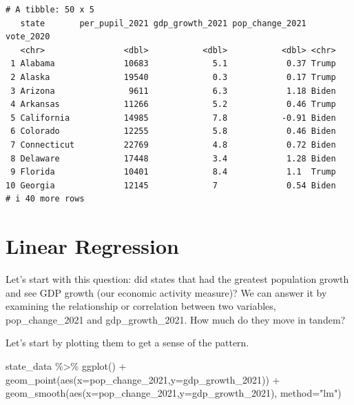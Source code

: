 \documentclass[
  letterpaper,
  DIV=11,
  numbers=noendperiod]{scrreprt}
\newenvironment{Shaded}{\begin{snugshade}}{\end{snugshade}}
\newcommand{\AttributeTok}[1]{\textcolor[rgb]{0.40,0.45,0.13}{#1}}
\newcommand{\FunctionTok}[1]{\textcolor[rgb]{0.28,0.35,0.67}{#1}}
\newcommand{\NormalTok}[1]{\textcolor[rgb]{0.00,0.23,0.31}{#1}}
\newcommand{\SpecialCharTok}[1]{\textcolor[rgb]{0.37,0.37,0.37}{#1}}
\newcommand{\StringTok}[1]{\textcolor[rgb]{0.13,0.47,0.30}{#1}}
\begin{document}
\begin{verbatim}
# A tibble: 50 x 5
   state       per_pupil_2021 gdp_growth_2021 pop_change_2021 vote_2020
   <chr>                <dbl>           <dbl>           <dbl> <chr>    
 1 Alabama              10683             5.1            0.37 Trump    
 2 Alaska               19540             0.3            0.17 Trump    
 3 Arizona               9611             6.3            1.18 Biden    
 4 Arkansas             11266             5.2            0.46 Trump    
 5 California           14985             7.8           -0.91 Biden    
 6 Colorado             12255             5.8            0.46 Biden    
 7 Connecticut          22769             4.8            0.72 Biden    
 8 Delaware             17448             3.4            1.28 Biden    
 9 Florida              10401             8.4            1.1  Trump    
10 Georgia              12145             7              0.54 Biden    
# i 40 more rows
\end{verbatim}


\hypertarget{linear-regression}{%
\chapter{Linear Regression}\label{linear-regression}}

Let's start with this question: did states that had the greatest
population growth and see GDP growth (our economic activity measure)? We
can answer it by examining the relationship or correlation between two
variables, pop\_change\_2021 and gdp\_growth\_2021. How much do they
move in tandem?

Let's start by plotting them to get a sense of the pattern.

\begin{Shaded}
\begin{Highlighting}[]
\NormalTok{state\_data }\SpecialCharTok{\%\textgreater{}\%}
  \FunctionTok{ggplot}\NormalTok{() }\SpecialCharTok{+}
  \FunctionTok{geom\_point}\NormalTok{(}\FunctionTok{aes}\NormalTok{(}\AttributeTok{x=}\NormalTok{pop\_change\_2021,}\AttributeTok{y=}\NormalTok{gdp\_growth\_2021)) }\SpecialCharTok{+}
  \FunctionTok{geom\_smooth}\NormalTok{(}\FunctionTok{aes}\NormalTok{(}\AttributeTok{x=}\NormalTok{pop\_change\_2021,}\AttributeTok{y=}\NormalTok{gdp\_growth\_2021), }\AttributeTok{method=}\StringTok{"lm"}\NormalTok{)}
\end{Highlighting}
\end{Shaded}
\end{document}
